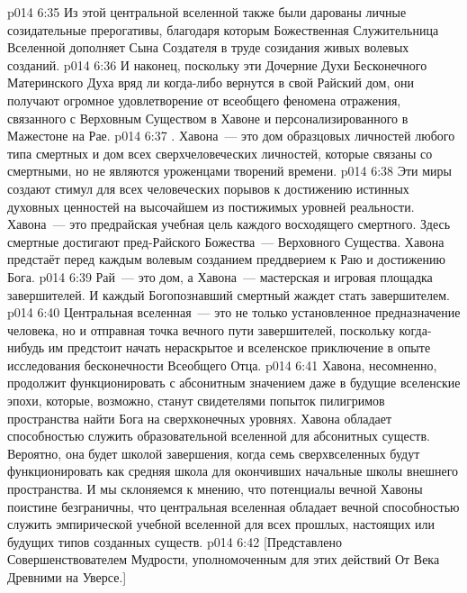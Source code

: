 \vs p014 6:35 Из этой центральной вселенной также были дарованы личные созидательные прерогативы, благодаря которым Божественная Служительница Вселенной дополняет Сына Создателя в труде созидания живых волевых созданий.
\vs p014 6:36 И наконец, поскольку эти Дочерние Духи Бесконечного Материнского Духа вряд ли когда\hyp{}либо вернутся в свой Райский дом, они получают огромное удовлетворение от всеобщего феномена отражения, связанного с Верховным Существом в Хавоне и персонализированного в Мажестоне на Рае.
\vs p014 6:37 . Хавона~--- это дом образцовых личностей любого типа смертных и дом всех сверхчеловеческих личностей, которые связаны со смертными, но не являются уроженцами творений времени.
\vs p014 6:38 Эти миры создают стимул для всех человеческих порывов к достижению истинных духовных ценностей на высочайшем из постижимых уровней реальности. Хавона~--- это предрайская учебная цель каждого восходящего смертного. Здесь смертные достигают пред\hyp{}Райского Божества~--- Верховного Существа. Хавона предстаёт перед каждым волевым созданием преддверием к Раю и достижению Бога.
\vs p014 6:39 Рай~--- это дом, а Хавона~--- мастерская и игровая площадка завершителей. И каждый Богопознавший смертный жаждет стать завершителем.
\vs p014 6:40 Центральная вселенная~--- это не только установленное предназначение человека, но и отправная точка вечного пути завершителей, поскольку когда\hyp{}нибудь им предстоит начать нераскрытое и вселенское приключение в опыте исследования бесконечности Всеобщего Отца.
\vs p014 6:41 \pc Хавона, несомненно, продолжит функционировать с абсонитным значением даже в будущие вселенские эпохи, которые, возможно, станут свидетелями попыток пилигримов пространства найти Бога на сверхконечных уровнях. Хавона обладает способностью служить образовательной вселенной для абсонитных существ. Вероятно, она будет школой завершения, когда семь сверхвселенных будут функционировать как средняя школа для окончивших начальные школы внешнего пространства. И мы склоняемся к мнению, что потенциалы вечной Хавоны поистине безграничны, что центральная вселенная обладает вечной способностью служить эмпирической учебной вселенной для всех прошлых, настоящих или будущих типов созданных существ.
\vsetoff
\vs p014 6:42 [Представлено Совершенствователем Мудрости, уполномоченным для этих действий От Века Древними на Уверсе.]
\quizlink
